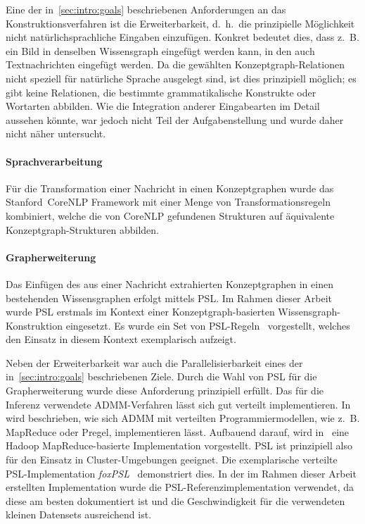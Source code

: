 Eine der in~\ref{sec:intro:goals} beschriebenen Anforderungen an das Konstruktionsverfahren ist die Erweiterbarkeit, d.~h.\ die prinzipielle Möglichkeit nicht natürlichsprachliche Eingaben einzufügen.
Konkret bedeutet dies, dass z.~B. ein Bild in denselben Wissensgraph eingefügt werden kann, in den auch Textnachrichten eingefügt werden.
Da die gewählten Konzeptgraph-Relationen nicht speziell für natürliche Sprache ausgelegt sind, ist dies prinzipiell möglich;
es gibt keine Relationen, die bestimmte grammatikalische Konstrukte oder Wortarten abbilden.
Wie die Integration anderer Eingabearten im Detail aussehen könnte, war jedoch nicht Teil der Aufgabenstellung und wurde daher nicht näher untersucht.

\paragraph{Sprachverarbeitung}
Für die Transformation einer Nachricht in einen Konzeptgraphen wurde das Stanford~CoreNLP Framework mit einer Menge von Transformationsregeln~ kombiniert, welche die von CoreNLP gefundenen Strukturen auf äquivalente Konzeptgraph-Strukturen abbilden.

\paragraph{Grapherweiterung}
Das Einfügen des aus einer Nachricht extrahierten Konzeptgraphen in einen bestehenden Wissensgraphen erfolgt mittels PSL.\@
Im Rahmen dieser Arbeit wurde PSL erstmals im Kontext einer Konzeptgraph-basierten Wissensgraph-Konstruktion eingesetzt.
Es wurde ein Set von PSL-Regeln~ vorgestellt, welches den Einsatz in diesem Kontext exemplarisch aufzeigt.

Neben der Erweiterbarkeit war auch die Parallelisierbarkeit eines der in~\ref{sec:intro:goals} beschriebenen Ziele.
Durch die Wahl von PSL für die Grapherweiterung wurde diese Anforderung prinzipiell erfüllt.
Das für die Inferenz verwendete ADMM-Verfahren lässt sich gut verteilt implementieren.
In~\cite[Kapitel 10]{Boyd2011} wird beschrieben, wie sich ADMM mit verteilten Programmiermodellen, wie z.~B. MapReduce oder Pregel, implementieren lässt.
Aufbauend darauf, wird in~\cite{Lubell-Doughtie2013} eine Hadoop MapReduce-basierte Implementation vorgestellt.
PSL ist prinzipiell also für den Einsatz in Cluster-Umgebungen geeignet.
Die exemplarische verteilte PSL-Implementation \textit{foxPSL}~\cite{Magliacane2015} demonstriert dies.
In der im Rahmen dieser Arbeit erstellten Implementation wurde die PSL-Referenzimplementation verwendet, da diese am besten dokumentiert ist und die Geschwindigkeit für die verwendeten kleinen Datensets ausreichend ist.

